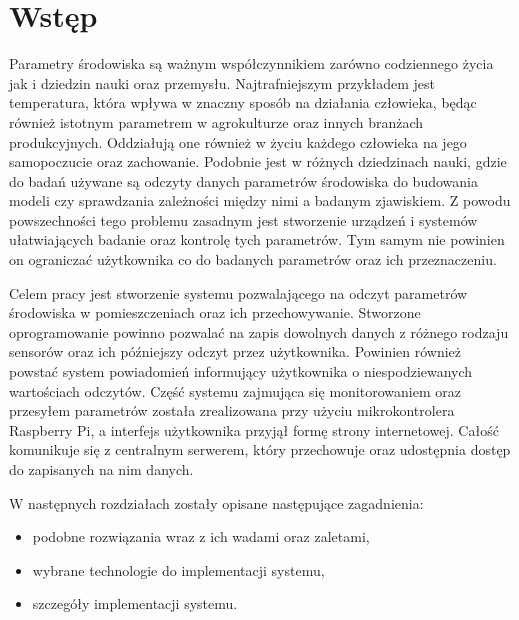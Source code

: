 \chapter{Wstęp}

Parametry środowiska są ważnym współczynnikiem zarówno codziennego życia jak
i dziedzin nauki oraz przemysłu. Najtrafniejszym przykładem jest temperatura, 
która wpływa w znaczny sposób na działania człowieka, będąc również istotnym
parametrem w agrokulturze oraz innych branżach produkcyjnych. Oddziałują
one również w życiu każdego człowieka na jego samopoczucie oraz zachowanie.
Podobnie jest w różnych dziedzinach nauki, gdzie do badań używane są odczyty
danych parametrów środowiska do budowania modeli czy sprawdzania zależności
między nimi a badanym zjawiskiem. Z powodu powszechności
tego problemu zasadnym jest stworzenie urządzeń i systemów ułatwiających badanie
oraz kontrolę tych parametrów. Tym samym nie powinien on ograniczać użytkownika
co do badanych parametrów oraz ich przeznaczeniu.

Celem pracy jest stworzenie systemu pozwalającego na odczyt parametrów środowiska
w pomieszczeniach oraz ich przechowywanie. Stworzone oprogramowanie powinno pozwalać
na zapis dowolnych danych z różnego rodzaju sensorów oraz ich późniejszy odczyt
przez użytkownika. Powinien również powstać system powiadomień informujący
użytkownika o niespodziewanych wartościach odczytów.
Część systemu zajmująca się monitorowaniem oraz przesyłem
parametrów została zrealizowana przy użyciu mikrokontrolera Raspberry Pi, a
interfejs użytkownika przyjął formę strony internetowej. Całość komunikuje się
z centralnym serwerem, który przechowuje oraz udostępnia dostęp do
zapisanych na nim danych.

W następnych rozdziałach zostały opisane następujące zagadnienia:
\begin{itemize}
  \item podobne rozwiązania wraz z ich wadami oraz zaletami,
  \item wybrane technologie do implementacji systemu,
  \item szczegóły implementacji systemu.
\end{itemize}

